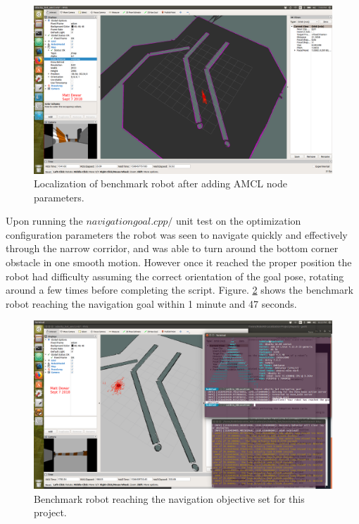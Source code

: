 \documentclass[10pt,journal,compsoc]{IEEEtran}
\begin{document}
\begin{figure}[thpb]
    \centering
    \includegraphics[width=\linewidth]{../img/rviz-w-amcl-param.png}
    \caption{Localization of benchmark robot after adding AMCL node parameters.}
    \label{fig:afterAMCLParam}
\end{figure}

Upon running the \textit{$navigation goal.cpp/$} unit test on the optimization configuration parameters the robot was seen to navigate quickly and effectively through the narrow corridor, and was able to turn around the bottom corner obstacle in one smooth motion. However once it reached the proper position the robot had difficulty assuming the correct orientation of the goal pose, rotating around a few times before completing the script. Figure. \ref{fig:benchmarkNavGoal} shows the benchmark robot reaching the navigation goal within 1 minute and 47 seconds.

\begin{figure}[thpb]
    \centering
    \includegraphics[width=\linewidth]{../img/reached_navigation_goal.png}
    \caption{Benchmark robot reaching the navigation objective set for this project.}
    \label{fig:benchmarkNavGoal}
\end{figure}
\end{document}
